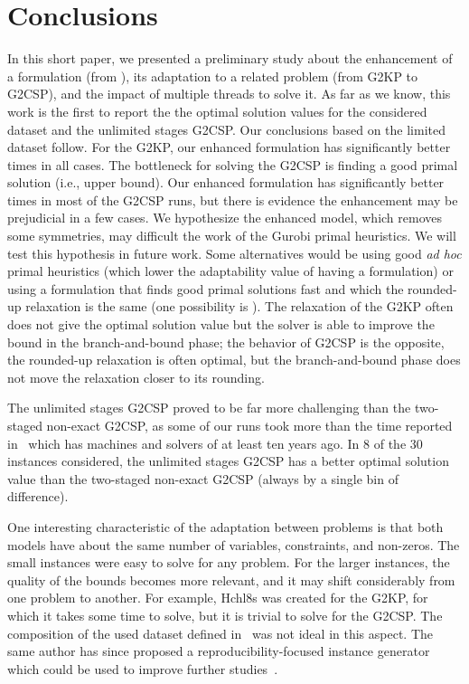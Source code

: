 \documentclass[9pt]{entcs}
\begin{document}
\section{Conclusions}

In this short paper, we presented a preliminary study about the enhancement of a formulation (from \cite{furini:2016}), its adaptation to a related problem (from G2KP to G2CSP), and the impact of multiple threads to solve it.
As far as we know, this work is the first to report the the optimal solution values for the considered dataset and the unlimited stages G2CSP.
Our conclusions based on the limited dataset follow.
For the G2KP, our enhanced formulation has significantly better times in all cases.
The bottleneck for solving the G2CSP is finding a good primal solution (i.e., upper bound).
Our enhanced formulation has significantly better times in most of the G2CSP runs, but there is evidence the enhancement may be prejudicial in a few cases.
We hypothesize the enhanced model, which removes some symmetries, may difficult the work of the Gurobi primal heuristics.
We will test this hypothesis in future work.
Some alternatives would be using good \emph{ad hoc} primal heuristics (which lower the adaptability value of having a formulation) or using a formulation that finds good primal solutions fast and which the rounded-up relaxation is the same (one possibility is \cite{martin:2020:top}).
The relaxation of the G2KP often does not give the optimal solution value but the solver is able to improve the bound in the branch-and-bound phase; the behavior of G2CSP is the opposite, the rounded-up relaxation is often optimal, but the branch-and-bound phase does not move the relaxation closer to its rounding.

The unlimited stages G2CSP proved to be far more challenging than the two-staged non-exact G2CSP, as some of our runs took more than the time reported in~\cite{silva:2010} which has machines and solvers of at least ten years ago.
In 8 of the 30 instances considered, the unlimited stages G2CSP has a better optimal solution value than the two-staged non-exact G2CSP (always by a single bin of difference).

One interesting characteristic of the adaptation between problems is that both models have about the same number of variables, constraints, and non-zeros.
The small instances were easy to solve for any problem.
For the larger instances, the quality of the bounds becomes more relevant, and it may shift considerably from one problem to another.
For example, Hchl8s was created for the G2KP, for which it takes some time to solve, but it is trivial to solve for the G2CSP.
The composition of the used dataset defined in~\cite{silva:2010} was not ideal in this aspect.
The same author has since proposed a reproducibility-focused instance generator which could be used to improve further studies~\cite{silva:2014}.
\end{document}
